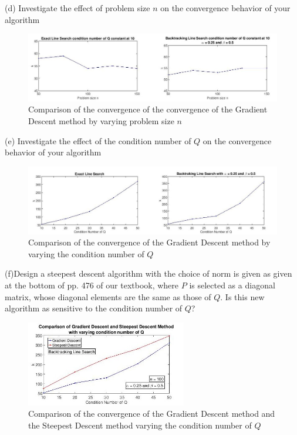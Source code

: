 (d) Investigate the effect of problem size $n$ on the convergence behavior of your algorithm\\

  \begin{figure}[H]
  \centering
\includegraphics[width=\textwidth]{source/prob1/figu3}
\caption{Comparison of the convergence of the convergence of the Gradient Descent method by varying problem size $n$}
\end{figure}

(e) Investigate the effect of the condition number of $Q$ on the convergence behavior of your algorithm\\

  \begin{figure}[H]
  \centering
\includegraphics[width=\textwidth]{source/prob1/figu4}
\caption{Comparison of the convergence of the Gradient Descent method by varying the condition number of $Q$}
\end{figure}

(f)Design a steepest descent algorithm with the choice of norm is given as given at the bottom of pp. 476 of our textbook, where $P$ is selected as a diagonal matrix, whose diagonal elements are the
    same as those of $Q$. Is this new algorithm as sensitive to the condition number of $Q$?
    \begin{figure}[H]
  \centering
\includegraphics[width=7cm]{source/prob1/fig9}
\caption{Comparison of the convergence of the Gradient Descent method and the Steepest Descent method varying the condition number of $Q$}
\end{figure}  

